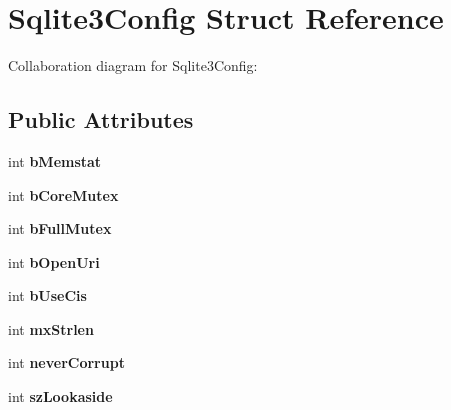 \hypertarget{struct_sqlite3_config}{\section{Sqlite3\+Config Struct Reference}
\label{struct_sqlite3_config}
}


Collaboration diagram for Sqlite3\+Config\+:
\subsection*{Public Attributes}
\begin{DoxyCompactItemize}
\item 
\hypertarget{struct_sqlite3_config_aae01de5f37a66422f2a7413e108e03fe}{int {\bfseries b\+Memstat}}\label{struct_sqlite3_config_aae01de5f37a66422f2a7413e108e03fe}

\item 
\hypertarget{struct_sqlite3_config_a202216a82e0823d0a4629c4884215a54}{int {\bfseries b\+Core\+Mutex}}\label{struct_sqlite3_config_a202216a82e0823d0a4629c4884215a54}

\item 
\hypertarget{struct_sqlite3_config_aab880bf54370cd0f6210afce0fb646ee}{int {\bfseries b\+Full\+Mutex}}\label{struct_sqlite3_config_aab880bf54370cd0f6210afce0fb646ee}

\item 
\hypertarget{struct_sqlite3_config_af446c9f0657e5564b4dbba3421ffc8be}{int {\bfseries b\+Open\+Uri}}\label{struct_sqlite3_config_af446c9f0657e5564b4dbba3421ffc8be}

\item 
\hypertarget{struct_sqlite3_config_a3eb3eb5fe14358aba2a6e0083f29d807}{int {\bfseries b\+Use\+Cis}}\label{struct_sqlite3_config_a3eb3eb5fe14358aba2a6e0083f29d807}

\item 
\hypertarget{struct_sqlite3_config_a66f1f85ec9b7724f7fe0bebad61a634f}{int {\bfseries mx\+Strlen}}\label{struct_sqlite3_config_a66f1f85ec9b7724f7fe0bebad61a634f}

\item 
\hypertarget{struct_sqlite3_config_a6dc51cea630491a7c0694c1547894f1f}{int {\bfseries never\+Corrupt}}\label{struct_sqlite3_config_a6dc51cea630491a7c0694c1547894f1f}

\item 
\hypertarget{struct_sqlite3_config_ad7504c4c1867db9837b40d7c22ba7582}{int {\bfseries sz\+Lookaside}}\label{struct_sqlite3_config_ad7504c4c1867db9837b40d7c22ba7582}


\end{DoxyCompactItemize}

